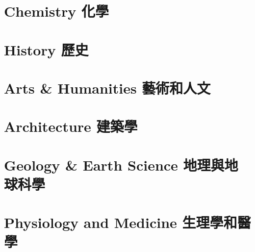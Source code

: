\documentclass[twoside,b5paper]{book}
\begin{document}
  \chapter{Chemistry 化學}

  \chapter{History 歷史}

  \chapter{Arts \& Humanities 藝術和人文}

  \chapter{Architecture 建築學}

  \chapter{Geology \& Earth Science 地理與地球科學}

  \chapter{Physiology and Medicine 生理學和醫學}
\end{document}
